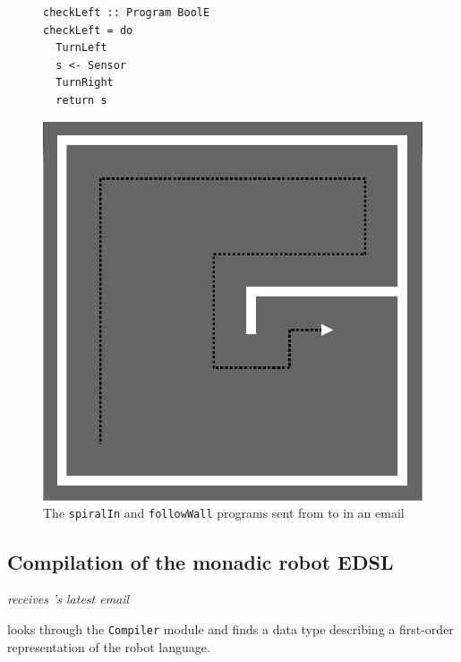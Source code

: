 \begin{figure}
\begin{minipage}[]{0.50\linewidth}
\begin{small}
\begin{verbatim}
checkLeft :: Program BoolE     
checkLeft = do
  TurnLeft
  s <- Sensor
  TurnRight 
  return s
\end{verbatim}
\end{small}
\end{minipage}
\hspace{0.05\linewidth}
\begin{minipage}[]{0.45\linewidth}
\includegraphics[width=\linewidth]{./bb/wall2}
\end{minipage}

\caption{The {\tt spiralIn} and {\tt followWall} programs sent from \studname{}
to \docname{} in an email}
\label{fig:programs}
\end{figure} 



\subsection{Compilation of the monadic robot EDSL} 
\emph{\docname{} receives \studname{}'s latest email}\newline %

\noindent \docname{} looks through the {\tt Compiler} module and finds a data type describing
a first-order representation of the robot language.

